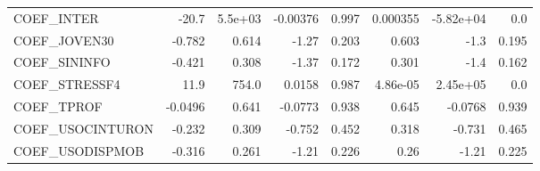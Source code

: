 \begin{tabular}{lrrrrrrr}
COEF\_INTER       &    -20.7 &  5.5e+03 & -0.00376 &    0.997 &      0.000355 &    -5.82e+04 &           0.0 \\
COEF\_JOVEN30     &   -0.782 &    0.614 &    -1.27 &    0.203 &         0.603 &         -1.3 &         0.195 \\
COEF\_SININFO     &   -0.421 &    0.308 &    -1.37 &    0.172 &         0.301 &         -1.4 &         0.162 \\
COEF\_STRESSF4    &     11.9 &    754.0 &   0.0158 &    0.987 &      4.86e-05 &     2.45e+05 &           0.0 \\
COEF\_TPROF       &  -0.0496 &    0.641 &  -0.0773 &    0.938 &         0.645 &      -0.0768 &         0.939 \\
COEF\_USOCINTURON &   -0.232 &    0.309 &   -0.752 &    0.452 &         0.318 &       -0.731 &         0.465 \\
COEF\_USODISPMOB  &   -0.316 &    0.261 &    -1.21 &    0.226 &          0.26 &        -1.21 &         0.225 \\
\bottomrule
\end{tabular}


